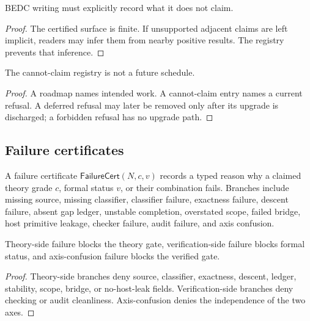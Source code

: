 \begin{theorem}
\label{thm:philosophy-refusals-recorded}
BEDC writing must explicitly record what it does not claim.
\end{theorem}
\begin{proof}
The certified surface is finite. If unsupported adjacent claims are
left implicit, readers may infer them from nearby positive results.
The registry prevents that inference.
\end{proof}

\begin{corollary}
\label{cor:philosophy-cannot-claim-not-roadmap}
The cannot-claim registry is not a future schedule.
\end{corollary}
\begin{proof}
A roadmap names intended work. A cannot-claim entry names a current
refusal. A deferred refusal may later be removed only after its upgrade
is discharged; a forbidden refusal has no upgrade path.
\end{proof}

\subsection{Failure certificates}
\label{subsec:philosophy-failure-certificates}

\begin{definition}
\label{def:philosophy-failure-certificate-discipline}
A failure certificate \(\mathsf{FailureCert}(N,c,v)\) records a typed
reason why a claimed theory grade \(c\), formal status \(v\), or their
combination fails. Branches include missing source, missing classifier,
classifier failure, exactness failure, descent failure, absent gap
ledger, unstable completion, overstated scope, failed bridge, host
primitive leakage, checker failure, audit failure, and axis confusion.
\end{definition}

\begin{theorem}
\label{thm:philosophy-failure-blocks-corresponding-gate}
Theory-side failure blocks the theory gate, verification-side failure
blocks formal status, and axis-confusion failure blocks the verified
gate.
\end{theorem}
\begin{proof}
Theory-side branches deny source, classifier, exactness, descent,
ledger, stability, scope, bridge, or no-host-leak fields.
Verification-side branches deny checking or audit cleanliness.
Axis-confusion denies the independence of the two axes.
\end{proof}

